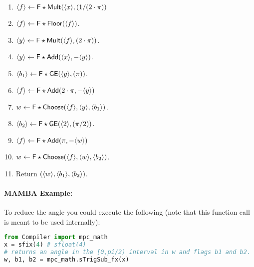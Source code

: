   \begin{enumerate}

    \item $\langle f \rangle \leftarrow \mathsf{F\star Mult}(\langle x \rangle,(1 /(2 \cdot \pi))$
    \item $\langle f \rangle \leftarrow \mathsf{F\star Floor}(\langle f \rangle)$.
    \item $\langle y \rangle \leftarrow \mathsf{F\star Mult}(\langle f \rangle,(2 \cdot \pi ))$.
    \item $\langle y \rangle \leftarrow \mathsf{F\star Add}(\langle x \rangle,-\langle y \rangle)$.
    \item $\langle b_1 \rangle \leftarrow \mathsf{F\star GE}(\langle y \rangle,(\pi))$.
    \item $\langle f \rangle \leftarrow \mathsf{F\star Add}(2 \cdot \pi,-\langle y \rangle)$
    \item $w \leftarrow \mathsf{F\star Choose}(\langle f \rangle,\langle y \rangle, \langle b_1 \rangle)$.
    \item $\langle b_2 \rangle \leftarrow \mathsf{F\star GE}(\langle 2 \rangle,(\pi / 2))$.
    \item $\langle f \rangle \leftarrow \mathsf{F\star Add}( \pi,-\langle w \rangle)$
    \item $w \leftarrow \mathsf{F\star Choose}(\langle f \rangle,\langle w \rangle, \langle b_2 \rangle)$.
    \item Return $(\langle w \rangle,\langle b_1 \rangle,\langle b_2 \rangle)$.

  \end{enumerate}

  \paragraph{MAMBA Example:} To reduce the angle you could execute the following (note that this function call is meant to be used internally):
  \begin{lstlisting}[language={python}]
from Compiler import mpc_math
x = sfix(4) # sfloat(4)
# returns an angle in the [0,pi/2) interval in w and flags b1 and b2.
w, b1, b2 = mpc_math.sTrigSub_fx(x)
\end{lstlisting}

